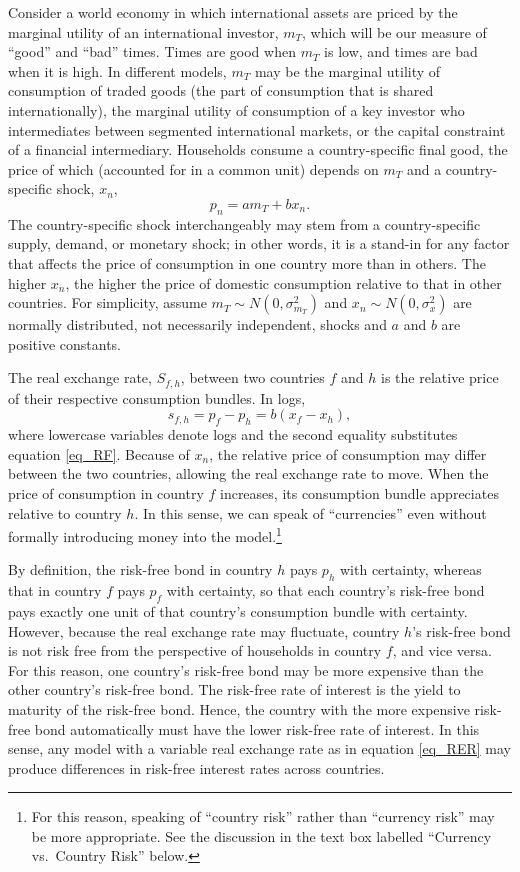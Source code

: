 \documentclass[11pt]{article}
\begin{document}
Consider a world economy in which international assets are priced by the marginal utility of an international investor, $m_T$, which will be our measure of ``good'' and ``bad'' times. Times are good when $m_T$ is low, and times are bad when it is high. In different models, $m_T$ may be the marginal utility of consumption of traded goods (the part of consumption that is shared internationally), the marginal utility of consumption of a key investor who intermediates between segmented international markets, or the capital constraint of a financial intermediary. Households consume a country-specific final good, the price of which (accounted for in a common unit) depends on $m_T$ and a country-specific shock, $x_n$,
\begin{equation}
  p_n = a m_T + b x_n.  
  \label{eq_RF}
\end{equation}%
The country-specific shock interchangeably may stem from a country-specific supply, demand, or monetary shock; in other words, it is a stand-in for any factor that affects the price of consumption in one country more than in others. The higher $x_n$, the higher the price of domestic consumption relative to that in other countries. For simplicity, assume $m_{T} \sim N(0, \sigma^2_{m_{T}})$ and $x_n \sim N(0,\sigma^2_x) $ are normally distributed, not necessarily independent, shocks and $a$ and $b$ are positive constants.

The real exchange rate, $S_{f, h}$, between two countries $f$ and $h$ is the relative price of their respective consumption bundles. In logs,
\begin{equation}
  s_{f,h} 
  = p_f - p_h 
  = b(x_f - x_h),
\label{eq_RER}
\end{equation}
where lowercase variables denote logs and the second equality substitutes equation \ref{eq_RF}. Because of $x_n$, the relative price of consumption may differ between the two countries, allowing the real exchange rate to move. When the price of consumption in country $f$ increases, its consumption bundle appreciates relative to country $h$. In this sense, we can speak of ``currencies'' even without formally introducing money into the model.\footnote{For this reason, speaking of ``country risk'' rather than ``currency risk'' may be more appropriate. See the discussion in the text box labelled ``Currency vs.~Country Risk'' below. }

By definition, the risk-free bond in country $h$ pays $p_h$ with certainty, whereas that in country $f$ pays $p_f$ with certainty, so that each country's risk-free bond pays exactly one unit of that country's consumption bundle with certainty. However, because the real exchange rate may fluctuate, country $h$'s risk-free bond is not risk free from the perspective of households in country $f$, and vice versa. For this reason, one country's risk-free bond may be more expensive than the other country's risk-free bond. The risk-free rate of interest is the yield to maturity of the risk-free bond.  Hence, the country with the more expensive risk-free bond automatically must have the lower risk-free rate of interest. In this sense, any model with a variable real exchange rate as in equation \ref{eq_RER} may produce differences in risk-free interest rates across countries.
\end{document}
